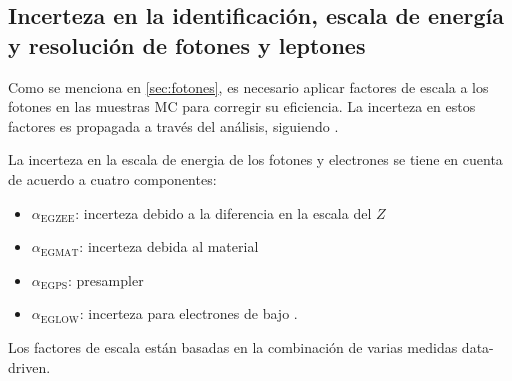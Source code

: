 \subsection{Incerteza en la identificación, escala de energía y resolución de fotones y leptones}

Como se menciona en \cref{sec:fotones}, es necesario aplicar factores de escala a los fotones en las
muestras MC para corregir su eficiencia. La incerteza en estos factores es propagada
a través del análisis, siguiendo \cite{PhoEffTwiki}. %

La incerteza en la escala de energia de los fotones y electrones se tiene en cuenta de acuerdo a cuatro componentes\cite{EGScaleTwiki}:

\begin{itemize}\itemsep0.2cm\parskip0.2cm
\item $\alpha_\text{EGZEE}$: incerteza debido a la diferencia en la escala del $Z$
\item $\alpha_\text{EGMAT}$: incerteza debida al material
\item $\alpha_\text{EGPS}$: presampler
\item $\alpha_\text{EGLOW}$: incerteza para electrones de bajo {\pt}.
\end{itemize}


Los factores de escala están basadas en la combinación de varias medidas data-driven.







